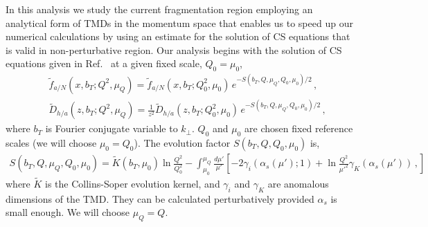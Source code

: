 \documentclass[final,3p,times,onecolumn,sort&compress,hidelinks]{elsarticle}
\newcommand\3[1]{\boldsymbol{#1}}
\begin{document}
 In this analysis we study the  current  fragmentation region employing  an analytical form of TMDs in the momentum space 
 that enables us  to speed up our numerical calculations by using 
 an estimate for the solution of CS equations that is valid in non-perturbative region. Our analysis begins with  the solution of CS equations given in Ref.~\cite{Collins:2014jpa} at a given fixed scale, $Q_0=\mu_0$,
\begin{eqnarray}
&&\tilde f_{a/N} (x,b_T; Q^2, \mu_Q)= \tilde f_{a/N} (x, b_T; Q_0^2, \mu_0)\,e^{-S(b_T, Q, \mu_Q, Q_0, \mu_0)/2}\,,
\label{e:PDF_ansatz}\\[0.3cm]
&&\tilde D_{h/a}(z,b_T; Q^2, \mu_Q)=\frac{1}{z^2}\tilde D_{h/a}(z, b_T; Q_0^2, \mu_0)\,e^{-S(b_T, Q, \mu_Q, Q_0, \mu_0)/2}\,,
\label{e:FF_ansatz0}
\end{eqnarray}
where $b_T$ is Fourier conjugate variable to $k_\perp$.   $Q_0$ and $\mu_0$ are chosen fixed reference scales (we will choose $\mu_0 = Q_0$).
The evolution factor  $S(b_T, Q, Q_0, \mu_0)$  is,
\begin{eqnarray}
S(b_T, Q, \mu_Q, Q_0, \mu_0) = \tilde K(b_T,\mu_0) \ln\frac{Q^2}{Q_0^2} - \int_{\mu_0}^{\mu_Q} \frac{d \mu'}{\mu'}\left[
-2 \gamma_i(\alpha_s(\mu');1) +\ln\frac{Q^2}{\mu'^2}\gamma_K(\alpha_s(\mu'))\,,
 \right]
 \label{e:FF_ansatz}
\end{eqnarray}
where $\tilde K$ is the Collins-Soper evolution kernel,  and
$\gamma_i$ and $\gamma_K$ are anomalous dimensions of the TMD. They  can be calculated perturbatively provided $\alpha_s$ is small enough. We will choose $\mu_Q = Q$. 
\end{document}
